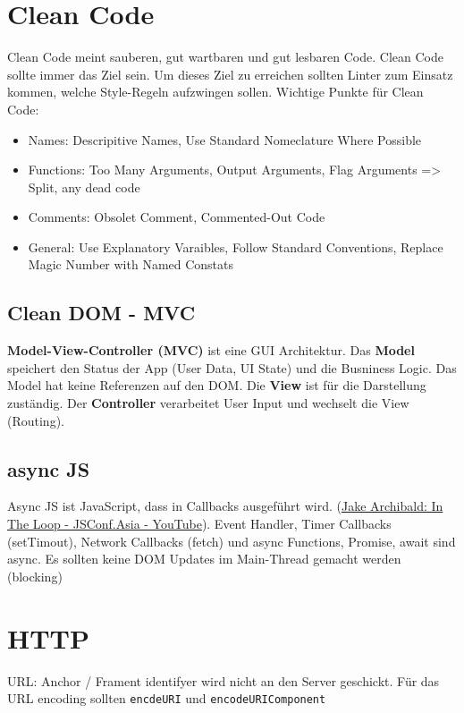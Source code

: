 \documentclass[11pt,twoside,landscape]{article}
\begin{document}
\begin{multicols}{4}
\section*{Clean Code}
\label{sec:org6d5d41f}
Clean Code meint sauberen, gut wartbaren und gut lesbaren Code. Clean Code sollte immer das Ziel sein. Um dieses Ziel zu erreichen sollten Linter zum Einsatz kommen, welche Style-Regeln aufzwingen sollen. 
Wichtige Punkte für Clean Code:
\begin{itemize}
\item Names: Descripitive Names, Use Standard Nomeclature Where Possible
\item Functions: Too Many Arguments, Output Arguments, Flag Arguments => Split, any dead code
\item Comments: Obsolet Comment, Commented-Out Code
\item General: Use Explanatory Varaibles, Follow Standard Conventions, Replace Magic Number with Named Constats
\end{itemize}

\subsection*{Clean DOM - MVC}
\label{sec:org53a2fae}
\textbf{Model-View-Controller (MVC)} ist eine GUI Architektur. Das \textbf{Model} speichert den Status der App (User Data, UI State) und die Busniness Logic. Das Model hat keine Referenzen auf den DOM. Die \textbf{View} ist für die Darstellung zuständig. Der \textbf{Controller} verarbeitet User Input und wechselt die View (Routing).

\subsection*{async JS}
\label{sec:orgd37fbee}
Async JS ist JavaScript, dass in Callbacks ausgeführt wird. (\href{https://youtu.be/cCOL7MC4Pl0?t=411}{Jake Archibald: In The Loop - JSConf.Asia - YouTube}). Event Handler, Timer Callbacks (setTimout), Network Callbacks (fetch) und async Functions, Promise, await sind async. Es sollten keine DOM Updates im Main-Thread gemacht werden (blocking)


\section*{HTTP}
\label{sec:org8dd472d}
URL: Anchor / Frament identifyer wird nicht an den Server geschickt. Für das URL encoding sollten \texttt{encdeURI} und \texttt{encodeURIComponent}



\end{multicols}
\end{document}
